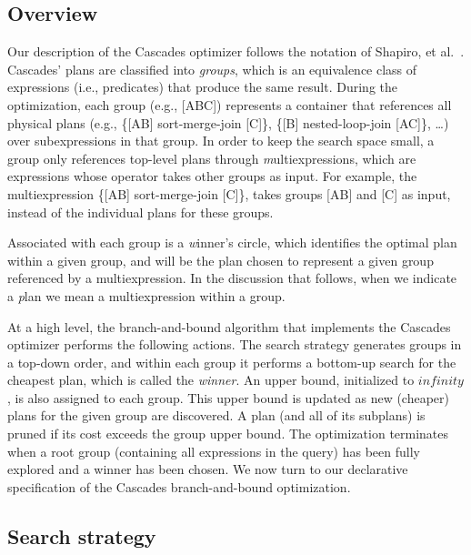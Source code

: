 \subsection{Overview}
\label{ch:opt:sec:overview}

Our description of the Cascades optimizer follows the notation of Shapiro, et
al.~\cite{Shapiro-opt}.  Cascades' plans are classified into {\em groups},
which is an equivalence class of expressions (i.e., predicates) that produce
the same result.  During the optimization, each group (e.g., [ABC]) represents
a container that references all physical plans (e.g., \{[AB] sort-merge-join
[C]\}, \{[B] nested-loop-join [AC]\}, \ldots) over subexpressions in that
group.  In order to keep the search space small, a group only references
top-level plans through {\emph multiexpressions}, which are expressions whose
operator takes other groups as input. For example, the multiexpression \{[AB]
sort-merge-join [C]\}, takes groups [AB] and [C] as input, instead of the
individual plans for these groups.  

Associated with each group is a {\emph winner's circle}, which identifies the
optimal plan within a given group, and will be the plan chosen to represent a
given group referenced by a multiexpression.  In the discussion that follows,
when we indicate a {\emph plan} we mean a multiexpression within a group.

At a high level, the branch-and-bound algorithm that implements the Cascades
optimizer performs the following actions.  The search strategy generates groups
in a top-down order, and within each group it performs a bottom-up search for
the cheapest plan, which is called the {\em winner}.  An upper bound,
initialized to $infinity$, is also assigned to each group.  This upper bound is
updated as new (cheaper) plans for the given group are discovered.  A plan (and
all of its subplans) is pruned if its cost exceeds the group upper bound.  The
optimization terminates when a root group (containing all expressions in the
query) has been fully explored and a winner has been chosen.  We now turn to
our declarative specification of the Cascades branch-and-bound optimization.

\subsection{Search strategy}
\label{ch:opt:sec:cascades_search}

